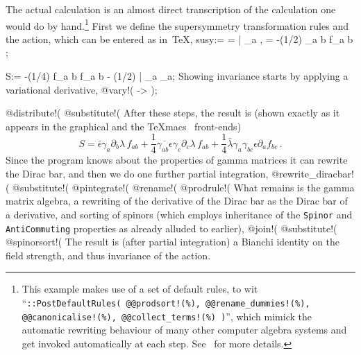 \documentclass{elsart}
\newenvironment{screen}{\vspace{1ex}\Verbatim}{\endVerbatim\vspace{1ex}}
\begin{document}
The actual calculation is an almost direct transcription of the
calculation one would do by hand.\footnote{This example makes use of a
set of default rules, to wit ``{\tt ::PostDefaultRules(
@@prodsort!(\%), @@rename\_dummies!(\%), @@canonicalise!(\%),
@@collect\_terms!(\%) )}'', which mimick the automatic rewriting
behaviour of many other computer algebra systems and get invoked
automatically at each step. See~\cite{kas_cdb} for more details.}
First we define the supersymmetry transformation rules and the action,
which can be entered as in~\TeX{},
\begin{screen}
susy:= {    = \bar{\epsilon} \gamma_{a} \lambda, 
         \delta{\lambda} = -(1/2) \gamma_{a b} \epsilon f_{a b} };

S:= -(1/4) f_{a b} f_{a b} 
              - (1/2) \bar{\lambda} \gamma_{a} \partial_{a}{\lambda};
\end{screen}
Showing invariance starts by applying a variational derivative,
\begin{screen}
@vary!(%
           \lambda -> \delta{\lambda} );

@distribute!(%
@substitute!(%
\end{screen}
After these steps, the result is (shown exactly as it appears in the
graphical and the \TeX{}macs~\cite{vdH:Gut} front-ends)%
\begin{equation}
S = \bar{\epsilon} \gamma_{a} \partial_{b} \lambda\, f_{ab}
  + \frac{1}{4} \overline{\gamma_{ab} \epsilon} \gamma_{c}
  \partial_c\lambda\, f_{ab}
  + \frac{1}{4} \bar{\lambda}\gamma_a \gamma_{bc} \epsilon \partial_a f_{bc}\,.
\end{equation}
Since the program knows about the properties of gamma matrices it can
rewrite the Dirac bar, and then we do one further partial integration,
\begin{screen}
@rewrite_diracbar!(%
@substitute!(%
@pintegrate!(%
@rename!(%
@prodrule!(%
\end{screen}
What remains is the gamma matrix algebra, a rewriting of the
derivative of the Dirac bar as the Dirac bar of a derivative, and
sorting of spinors (which employs inheritance of the {\tt Spinor} and
{\tt AntiCommuting} properties as already alluded to earlier),
\begin{screen}
@join!(%
@substitute!(%
@spinorsort!(%
\end{screen}
The result is (after partial integration) a Bianchi identity on the
field strength, and thus invariance of the action.
\end{document}

